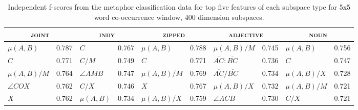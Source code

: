 \begin{table}
\centering
\tiny
\begin{tabular}{lr|lr|lr|lr|lr}
\hline
\multicolumn{2}{c}{\textsc{joint}} & \multicolumn{2}{c}{\textsc{indy}} & \multicolumn{2}{c}{\textsc{zipped}} & \multicolumn{2}{c}{\textsc{adjective}} & \multicolumn{2}{c}{\textsc{noun}} \\
\hline
$\mu(A,B)$ & 0.787 & $C$ & 0.767 & $\mu(A,B)$ & 0.788 & $\mu(A,B)/M$ & 0.745 & $\mu(A,B)$ & 0.756 \\
$C$ & 0.771 & $C/M$ & 0.749 & $C$ & 0.771 & $\overline{AC}:\overline{BC}$ & 0.736 & $C$ & 0.747 \\
$\mu(A,B)/M$ & 0.764 & $\angle AMB$ & 0.747 & $\mu(A,B)/M$ & 0.769 & $\overline{AC}/\overline{BC}$ & 0.734 & $\mu(A,B)/X$ & 0.728 \\
$\angle COX$ & 0.762 & $C/X$ & 0.746 & $X$ & 0.767 & $\mu(A,B)/X$ & 0.732 & $\mu(A,B)/M$ & 0.721 \\
$X$ & 0.762 & $\mu(A,B)$ & 0.734 & $\mu(A,B)/X$ & 0.759 & $\angle ACB$ & 0.730 & $C/X$ & 0.721 \\
\hline
\end{tabular}
\caption[Top Independent Features for Metaphor Classification]{Independent f-scores from the metaphor classification data for top five features of each subspace type for 5x5 word co-occurrence window, 400 dimension subspaces.}
\label{tab:ind-metaphor}
\end{table}


